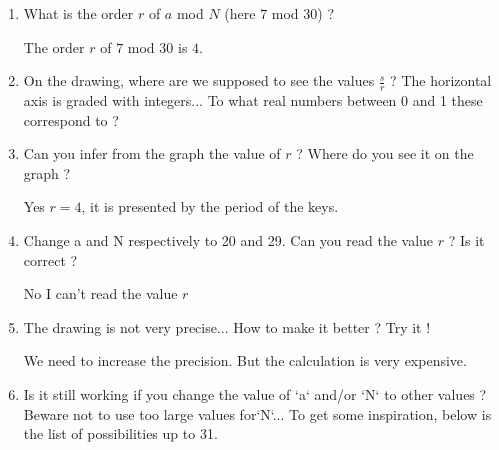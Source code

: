 \documentclass{article}
\theoremstyle{plain}
\begin{document}
    \begin{enumerate}
      \item What is the order $r$ of $a$ mod $N$ (here $7$ mod $30$) ?

        The order $r$ of $7$ mod $30$ is $4$.

      \item On the drawing, where are we supposed to see the values $\frac{s}{r}$ ?
        The horizontal axis is graded with integers... To what real numbers
        between 0 and 1 these correspond to ?

      \item Can you infer from the graph the value of $r$ ? Where do you see it
        on the graph ?

        Yes $r = 4$, it is presented by the period of the keys.

      \item Change a and N respectively to 20 and 29. Can you read the value $r$ ? Is it correct ?

        No I can't read the value $r$

      \item The drawing is not very precise... How to make it better ? Try it !

        We need to increase the precision. But the calculation is very
        expensive.

      \item Is it still working if you change the value of `a` and/or `N` to
        other values ? Beware not to use too large values for`N`... To get some
        inspiration, below is the list of possibilities up to 31.
    \end{enumerate}
\end{document}
